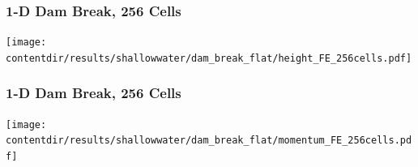\documentclass{beamer} \useoutertheme{infolines}
\newcommand{\contentdir}{../../dissertation/content}
\begin{document}
\begin{frame}
\frametitle{1-D Dam Break, 256 Cells}

\begin{center}
   \texttt{[image: \\contentdir/results/shallowwater/dam\_break\_flat/height\_FE\_256cells.pdf]}
\end{center}

\end{frame}
\begin{frame}
\frametitle{1-D Dam Break, 256 Cells}

\begin{center}
   \texttt{[image: \\contentdir/results/shallowwater/dam\_break\_flat/momentum\_FE\_256cells.pdf]}
\end{center}

\end{frame}
\end{document}
